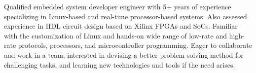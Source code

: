 

\begin{cvparagraph}
Qualified embedded system developer engineer with 5+ years of experience specializing in Linux-based and real-time processor-based systems. Also assessed experience in HDL circuit design based on Xilinx FPGAs and SoCs. Familiar with the customization of Linux and hands-on wide range of low-rate and high-rate protocols, processors, and microcontroller programming. Eager to collaborate and work in a team, interested in devising a better problem-solving method for challenging tasks, and learning new technologies and tools if the need arises.
\end{cvparagraph}
